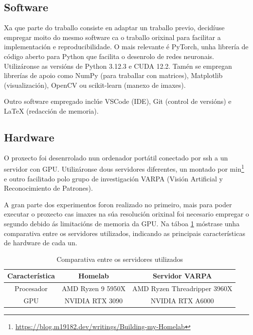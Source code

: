 \subsection{Software}
\label{subsec:Software}

Xa que parte do traballo consiste en adaptar un traballo previo, 
decidíuse empregar moito do mesmo software ca o traballo orixinal para facilitar a implementación e reproducibilidade.
O mais relevante é PyTorch, unha librería de código aberto para Python que facilita o desenrolo de redes neuronais. Utilizáronse as versións de Python 3.12.3 e CUDA 12.2. Tamén se empregan librerías de apoio como NumPy (para traballar con matrices), Matplotlib (visualización), OpenCV ou scikit-learn (manexo de imaxes).

Outro software empregado inclúe VSCode (IDE), Git (control de versións) e LaTeX (redacción de memoria).

\subsection{Hardware}
\label{subsec:Hardware}

O proxecto foi desenrrolado nun ordenador portátil conectado por ssh a un servidor con GPU. 
Utilizáronse dous servidores diferentes, un montado por min\footnote{\url{https://blog.m19182.dev/writings/Building-my-Homelab}} e outro facilitado polo grupo de investigación VARPA (Visión Artificial y Reconocimiento de Patrones).

A gran parte dos experimentos foron realizado no primeiro, mais para poder executar o proxecto cas imaxes na súa resolución orixinal foi necesario empregar o segundo 
debido ás limitacións de memoria da GPU. Na táboa \ref{tab:comparativa_servidores} móstrase unha comparativa entre os servidores utilizados, indicando as principais características de hardware de cada un.

\begin{table}[tbp]
\centering
\begin{tabular}{|c|c|c|}
\hline
\textbf{Característica} & \textbf{Homelab} & \textbf{Servidor VARPA} \\ \hline
Procesador & AMD Ryzen 9 5950X&  AMD Ryzen Threadripper 3960X \\ \hline
GPU & NVIDIA RTX 3090 & NVIDIA RTX A6000  \\ \hline
\end{tabular}
\caption{Comparativa entre os servidores utilizados}
\label{tab:comparativa_servidores}
\end{table}


